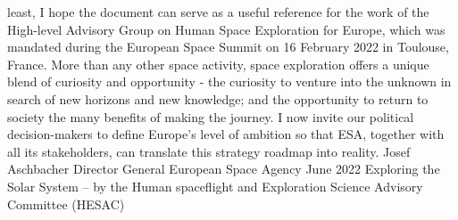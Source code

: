 \documentclass[12pt]{article}
\begin{document}
least, I hope the document can serve as a useful reference for the work of the High-level Advisory Group on Human Space Exploration for Europe, which was mandated during the European Space Summit on 16 February 2022 in Toulouse, France. More than any other space activity, space exploration offers a unique blend of curiosity and opportunity - the curiosity to venture into the unknown in search of new horizons and new knowledge; and the opportunity to return to society the many benefits of making the journey. I now invite our political decision-makers to define Europe’s level of ambition so that ESA, together with all its stakeholders, can translate this strategy roadmap into reality. Josef Aschbacher Director General European Space Agency June 2022 Exploring the Solar System – by the Human spaceflight and Exploration Science Advisory Committee (HESAC)
\end{document}

